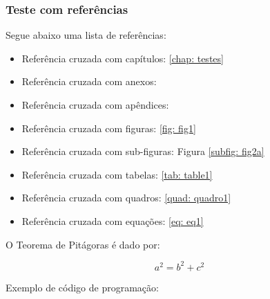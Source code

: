 \subsubsection{Teste com referências}

Segue abaixo uma lista de referências:

\begin{itemize}%
  \item Referência cruzada com capítulos: \autoref{chap: testes}
  \item Referência cruzada com anexos: 
  \item Referência cruzada com apêndices: 
  \item Referência cruzada com figuras: \autoref{fig: fig1}
  \item Referência cruzada com sub-figuras: Figura \ref{subfig: fig2a}
  \item Referência cruzada com tabelas: \autoref{tab: table1}
  \item Referência cruzada com quadros: \autoref{quad: quadro1}
  \item Referência cruzada com equações: \autoref{eq: eq1}
\end{itemize}
    

O Teorema de Pitágoras é dado por:

\begin{equation}
    \label{eq: eq1}
	a^{2}= b^{2}+c^{2}
\end{equation}

Exemplo de código de programação:
  

